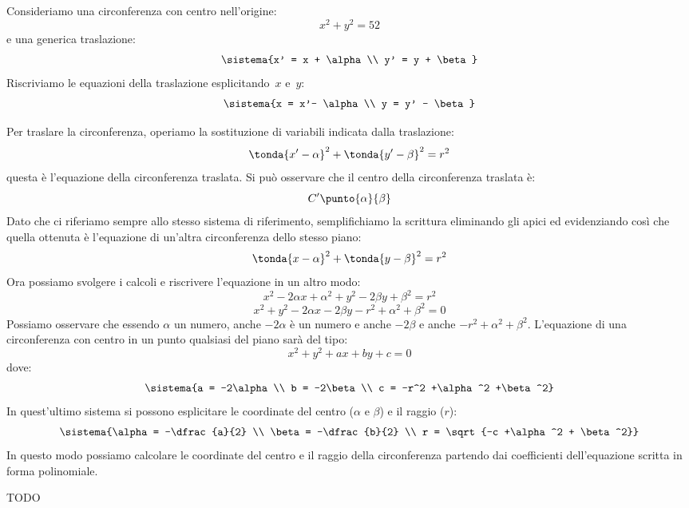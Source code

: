 Consideriamo una circonferenza con centro nell'origine:
\[x^2 + y^2 = 52\]
e una generica traslazione:
\[\sistema{x' = x + \alpha \\ y' = y + \beta}\]
Riscriviamo le equazioni della traslazione esplicitando~\(x\) e~\(y\):
\[\sistema{x = x'- \alpha \\ y = y' - \beta}\]

Per traslare la circonferenza, operiamo la sostituzione di variabili
indicata dalla traslazione:
\[\tonda{x'-\alpha}^2 + \tonda{y'-\beta}^2 = r^2\]
questa è l'equazione della circonferenza traslata. Si può osservare che il 
centro della circonferenza traslata è: 
\[C'\punto{\alpha}{\beta}\]
Dato che ci riferiamo sempre allo stesso sistema di riferimento, semplifichiamo 
la scrittura eliminando gli apici ed evidenziando così che quella ottenuta è 
l'equazione di un'altra circonferenza dello stesso piano:
\[\tonda{x-\alpha}^2 + \tonda{y-\beta}^2 = r^2\]
Ora possiamo svolgere i calcoli e riscrivere l'equazione in un altro modo:
\[x^2 -2 \alpha x + \alpha^2 + y^2 -2 \beta y + \beta^2 = r^2\]
\[x^2 + y^2 -2 \alpha x -2 \beta y - r^2 + \alpha^2 + \beta^2 = 0\]
Possiamo osservare che essendo \(\alpha\) un numero, anche \(-2\alpha\) è un 
numero e anche \(-2\beta\) e anche \(- r^2 + \alpha^2 + \beta^2\). 
L'equazione di una circonferenza con centro in un punto qualsiasi del piano 
sarà del tipo:
\[x^2 + y^2 +a x +b y +c = 0\]
dove:
\[\sistema{a = -2\alpha \\ b = -2\beta \\ c = -r^2 +\alpha^2 +\beta^2}\]
In quest'ultimo sistema si possono esplicitare le coordinate del 
centro (\(\alpha\) e \(\beta\)) e il raggio (\(r\)):
\[\sistema{\alpha = -\dfrac{a}{2} \\ 
           \beta = -\dfrac{b}{2} \\ 
           r = \sqrt{-c +\alpha^2 + \beta^2}}\]
In questo modo possiamo calcolare le coordinate del centro e il raggio della 
circonferenza partendo dai coefficienti dell'equazione scritta in forma 
polinomiale.

\noindent\begin{minipage}{.48\textwidth}
TODO
\end{minipage}
\hfill
\begin{minipage}{.48\textwidth}
\begin{center}
\begin{inaccessibleblock}
\end{inaccessibleblock}
\end{center}
\end{minipage}

